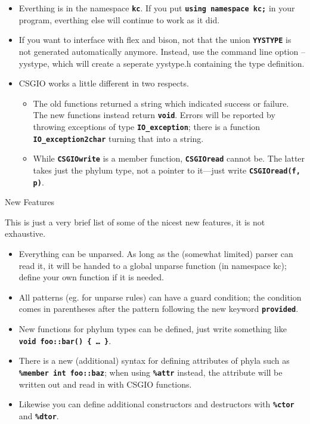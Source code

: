\documentclass[a4paper,10pt]{article}
\newcommand{\programtext}[1]{\texttt{\textbf{#1}}}
\begin{document}
\begin{itemize}
    \item Everthing is in the namespace \programtext{kc}. If you put
    \programtext{using namespace kc;} in your program, everthing else will continue
    to work as it did.

    \item If you want to interface with flex and bison, not that the union
    \programtext{YYSTYPE} is not generated automatically anymore. Instead, use the
    command line option --yystype, which will create a seperate yystype.h containing
    the type definition.

    \item CSGIO works a little different in two respects.\begin{itemize}
	\item The old functions returned a string which indicated success or failure.
	The new functions instead return \programtext{void}. Errors will be reported
	by throwing exceptions of type \programtext{IO\_exception}; there is a
	function \programtext{IO\_exception2char} turning that into a string.
	\item While \programtext{CSGIOwrite} is a member function,
	\programtext{CSGIOread} cannot be. The latter takes just the phylum type, not
	a pointer to it---just write \programtext{CSGIOread(f, p)}.
	\end{itemize}
\end{itemize}
\clearpage
\begin{center}\large New Features\end{center}
This is just a very brief list of some of the nicest new features, it is not
exhaustive.
\begin{itemize}
    \item Everything can be unparsed. As long as the (somewhat limited) parser can
    read it, it will be handed to a global unparse function (in namespace kc); define
    your own function if it is needed.
    \item All patterns (eg. for unparse rules) can have a guard condition; the
    condition comes in parentheses after the pattern following the new keyword
    \programtext{provided}.
    \item New functions for phylum types can be defined, just write something like
    \programtext{void foo::bar() \{ \dots~\}}.
    \item There is a new (additional) syntax for defining attributes of phyla such as
    \programtext{\%member int foo::baz}; when using \programtext{\%attr} instead, the
    attribute will be written out and read in with CSGIO functions.
    \item Likewise you can define additional constructors and destructors with
    \programtext{\%ctor} and \programtext{\%dtor}.
\end{itemize}
\end{document}
